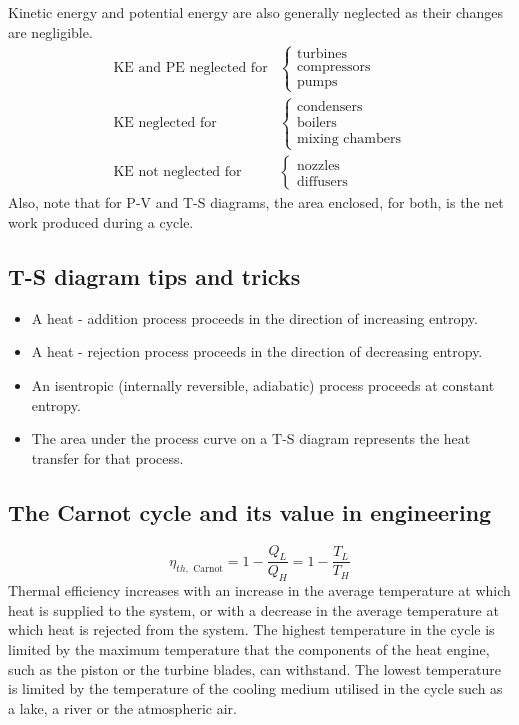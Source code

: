 Kinetic energy and potential energy are also generally neglected as their changes are negligible.
\begin{align}
  \textrm{KE and PE neglected for} & \begin{cases}
    \textrm{turbines}    \\
    \textrm{compressors} \\
    \textrm{pumps}
  \end{cases}  \\
  \textrm{KE neglected for}        & \begin{cases}
    \textrm{condensers} \\
    \textrm{boilers}    \\
    \textrm{mixing chambers}
  \end{cases}  \\
  \textrm{KE not neglected for}    & \begin{cases}
    \textrm{nozzles} \\
    \textrm{diffusers}
  \end{cases}
\end{align}
Also, note that for P-V and T-S diagrams, the area enclosed, for both, is the net work produced during a cycle.
\subsection{T-S diagram tips and tricks}
\begin{itemize}[noitemsep]
  \item A heat - addition process proceeds in the direction of increasing entropy.
  \item A heat - rejection process proceeds in the direction of decreasing entropy.
  \item An isentropic (internally reversible, adiabatic) process proceeds at constant entropy.
  \item The area under the process curve on a T-S diagram represents the heat transfer for that process.
\end{itemize}
\subsection{The Carnot cycle and its value in engineering}
\begin{equation}
  \eta_{th, \textrm{ Carnot}} = 1 - \frac{Q_L}{Q_H} = 1 - \frac{T_L}{T_H}
  \label{carnotefficiency}
\end{equation}
Thermal efficiency increases with an increase in the average temperature at which heat is supplied to the system, or with a decrease in the average temperature at which heat is rejected from the system. The highest temperature in the cycle is limited by the maximum temperature that the components of the heat engine, such as the piston or the turbine blades, can withstand. The lowest temperature is limited by the temperature of the cooling medium utilised in the cycle such as a lake, a river or the atmospheric air.

